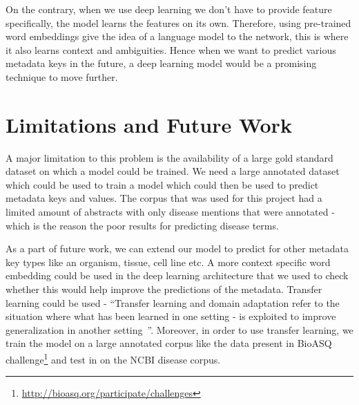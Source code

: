On the contrary, when we use deep learning we don't have to provide feature specifically, the model learns the features on its own. Therefore, using pre-trained word embeddings give the idea of a language model to the network, this is where it also learns context and ambiguities. Hence when we want to predict various metadata keys in the future, a deep learning model would be a promising technique to move further. 

\section{Limitations and Future Work}\label{sec:futurework}
A major limitation to this problem is the availability of a large gold standard dataset on which a model could be trained. We need a large annotated dataset which could be used to train a model which could then be used to predict metadata keys and values. 
The corpus that was used for this project had a limited amount of abstracts with only disease mentions that were annotated - which is the reason the poor results for predicting disease terms. 

As a part of future work, we can extend our model to predict for other metadata key types like an organism, tissue, cell line etc. A more context specific word embedding could be used in the deep learning architecture that we used to check whether this would help improve the predictions of the metadata. Transfer learning could be used - ``Transfer learning and domain adaptation refer to the situation where what has been learned in one setting - is exploited to improve generalization in another setting~\cite{Goodfellow-et-al-2016}''. Moreover, in order to use transfer learning, we train the model on a large annotated corpus like the data present in BioASQ challenge\footnote{\url{http://bioasq.org/participate/challenges}} and test in on the NCBI disease corpus. 







